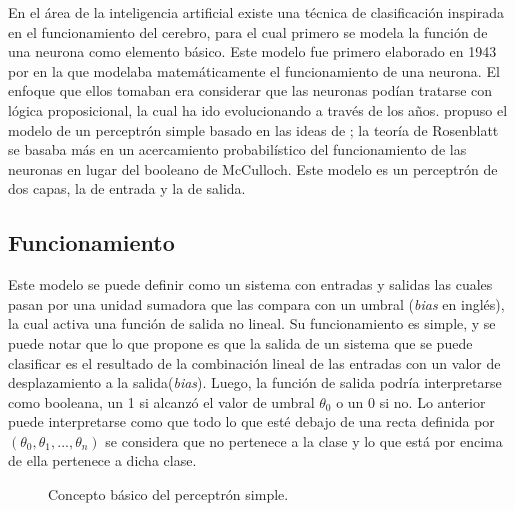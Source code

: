 \par En el área de la inteligencia artificial existe una técnica de clasificación inspirada en el funcionamiento del cerebro, para el cual primero se modela la función de una neurona como elemento básico. Este modelo fue primero elaborado en 1943 por \textcite{mcculloch1943logical} en la que modelaba matemáticamente el funcionamiento de una neurona. El enfoque que ellos tomaban era considerar que las neuronas podían tratarse con lógica proposicional, la cual ha ido evolucionando a través de los años.  \textcite{rosenblatt1958perceptron} propuso el modelo de un perceptrón simple basado en las ideas de \textcite{mcculloch1943logical}; la teoría de Rosenblatt se basaba más en un acercamiento probabilístico del funcionamiento de las neuronas en lugar del booleano de McCulloch. Este modelo es un perceptrón de dos capas, la de entrada y la de salida.

\subsection{Funcionamiento}

\par Este modelo se puede definir como un sistema con entradas y salidas las cuales pasan por una unidad sumadora que las compara con un umbral (\textit{bias} en inglés), la cual activa una función de salida no lineal. Su funcionamiento es simple, y se puede notar que lo que propone es que la salida de un sistema que se puede clasificar es el resultado de la combinación lineal de las entradas con un valor de desplazamiento a la salida(\textit{bias}). Luego, la función de salida podría interpretarse como booleana, un 1 si alcanzó el valor de umbral $\theta_{0}$ o un 0 si no. Lo anterior puede interpretarse como que todo lo que esté debajo de una recta definida por $(\theta_0,\theta_1,...,\theta_n)$ se considera que no pertenece a la clase y lo que está por encima de ella pertenece a dicha clase.
\begin{figure}[H]
	\centering
	
	\caption{Concepto básico del perceptrón simple.}
	\label{fig:perceptron}
\end{figure}

